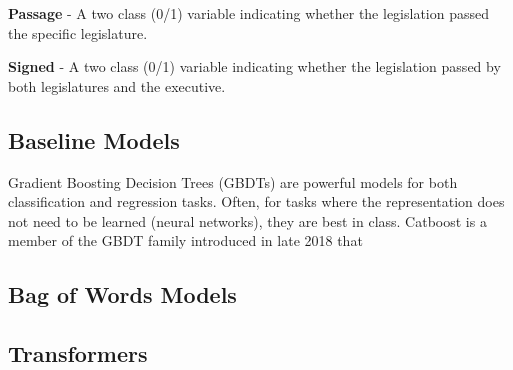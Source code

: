 \documentclass[11pt]{article}
\begin{document}
\textbf{Passage} - A two class (0/1) variable indicating whether the legislation passed the specific legislature. 

\textbf{Signed} - A two class (0/1) variable indicating whether the legislation passed by both legislatures and the executive.

\subsection{Baseline Models}

Gradient Boosting Decision Trees (GBDTs) are powerful models for both classification and regression tasks. Often, for tasks where the representation does not
need to be learned (neural networks), they are best in class. Catboost is a member of the GBDT family introduced in late 2018 that 

\subsection{Bag of Words Models}

\subsection{Transformers}







\end{document}
